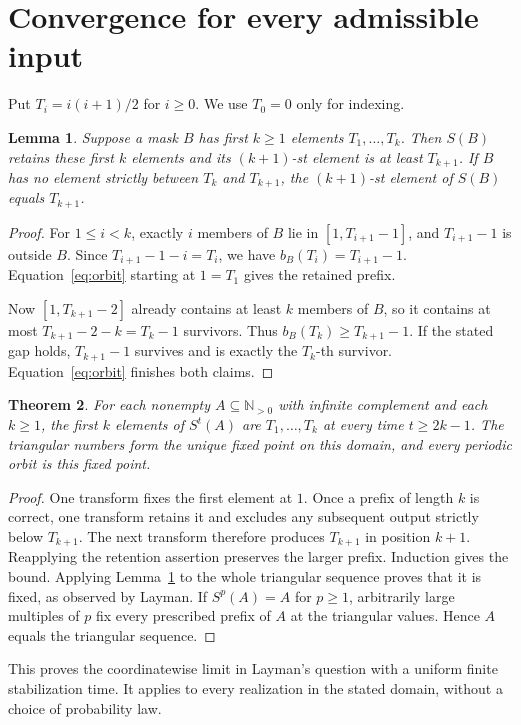 \documentclass[11pt]{article}
\newtheorem{theorem}{Theorem}
\newtheorem{lemma}[theorem]{Lemma}
\newcommand{\NN}{\mathbb N_{>0}}
\begin{document}
\section{Convergence for every admissible input}
Put $T_i=i(i+1)/2$ for $i\ge0$. We use $T_0=0$ only for indexing.
\begin{lemma}\label{lem:prefix}
Suppose a mask $B$ has first $k\ge1$ elements $T_1,\ldots,T_k$.
Then $S(B)$ retains these first $k$ elements and its $(k+1)$-st
element is at least $T_{k+1}$. If $B$ has no element strictly between
$T_k$ and $T_{k+1}$, the $(k+1)$-st element of $S(B)$ equals $T_{k+1}$.
\end{lemma}
\begin{proof}
For $1\le i<k$, exactly $i$ members of $B$ lie in
$[1,T_{i+1}-1]$, and $T_{i+1}-1$ is outside $B$. Since
$T_{i+1}-1-i=T_i$, we have $b_B(T_i)=T_{i+1}-1$. Equation~\eqref{eq:orbit}
starting at $1=T_1$ gives the retained prefix.

Now $[1,T_{k+1}-2]$ already contains at least $k$ members of $B$,
so it contains at most $T_{k+1}-2-k=T_k-1$ survivors. Thus
$b_B(T_k)\ge T_{k+1}-1$. If the stated gap holds, $T_{k+1}-1$
survives and is exactly the $T_k$-th survivor. Equation~\eqref{eq:orbit}
finishes both claims.
\end{proof}

\begin{theorem}\label{thm:stable}
For each nonempty $A\subseteq\NN$ with infinite complement and each $k\ge1$,
the first $k$ elements of $S^t(A)$ are $T_1,\ldots,T_k$ at every time
$t\ge2k-1$. The triangular numbers form the unique fixed point on this
domain, and every periodic orbit is this fixed point.
\end{theorem}
\begin{proof}
One transform fixes the first element at $1$. Once a prefix of length
$k$ is correct, one transform retains it and excludes any subsequent output
strictly below $T_{k+1}$. The next transform therefore produces $T_{k+1}$
in position $k+1$. Reapplying the retention assertion preserves the larger
prefix. Induction gives the bound. Applying Lemma~\ref{lem:prefix} to the
whole triangular sequence proves that it is fixed, as observed by Layman.
If $S^p(A)=A$ for $p\ge1$, arbitrarily large multiples of $p$ fix every
prescribed prefix of $A$ at the triangular values. Hence $A$ equals the
triangular sequence.
\end{proof}
This proves the coordinatewise limit in Layman's question with a uniform
finite stabilization time. It applies to every realization in the stated
domain, without a choice of probability law.
\end{document}
